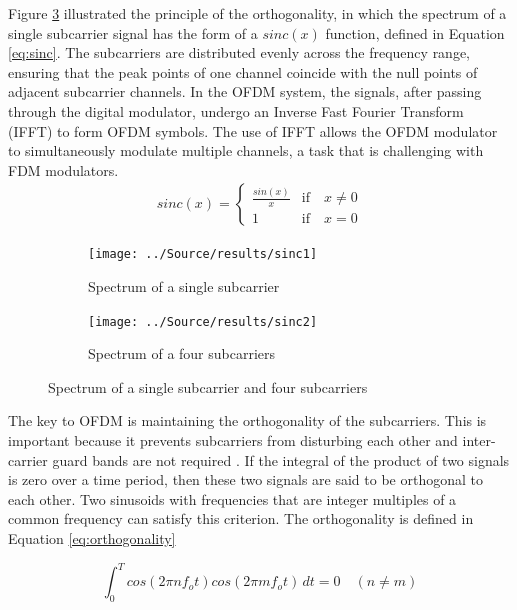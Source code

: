 Figure \ref{fig:sinx} illustrated the principle of the orthogonality, in which the spectrum of a single subcarrier signal has the form of a $sinc(x)$ function, defined in Equation \ref{eq:sinc}. The subcarriers are distributed evenly across the frequency range, ensuring that the peak points of one channel coincide with the null points of adjacent subcarrier channels. In the OFDM system, the signals, after passing through the digital modulator, undergo an Inverse Fast Fourier Transform (IFFT) to form OFDM symbols. The use of IFFT allows the OFDM modulator to simultaneously modulate multiple channels, a task that is challenging with FDM modulators.
\begin{align}\label{eq:sinc}
    sinc(x) =
    \begin{cases}
        \frac{sin(x)}{x} &\text{if} \quad x \neq 0\\
        1 &\text{if} \quad x = 0
    \end{cases}
\end{align}

\begin{figure}[htbp]
    \centering
    \begin{subfigure}[t]{.49\linewidth}
        \texttt{[image: ../Source/results/sinc1]}
        \caption{Spectrum of a single subcarrier}
        \label{fig:single}
    \end{subfigure}
    \hfil
    \begin{subfigure}[t]{0.49\linewidth}
        \texttt{[image: ../Source/results/sinc2]}
        \caption{Spectrum of a four subcarriers}
        \label{fig:four}
    \end{subfigure}
    \caption{Spectrum of a single subcarrier and four subcarriers}
    \label{fig:sinx}
\end{figure}

The key to OFDM is maintaining the orthogonality of the subcarriers. This is important because it prevents subcarriers from disturbing each other and inter-carrier guard bands are not required \cite{wikiOFDM}. If the integral of the product of two signals is zero over a time period, then these two signals are said to be orthogonal to each other. Two sinusoids with frequencies that are integer multiples of a common frequency can satisfy this criterion. The orthogonality is defined in Equation \ref{eq:orthogonality}

\begin{equation}\label{eq:orthogonality}
    \int_{0}^{T} cos(2 \pi n f_o t) cos(2 \pi m f_o t) \,dt = 0 \quad (n \neq m)
\end{equation}

